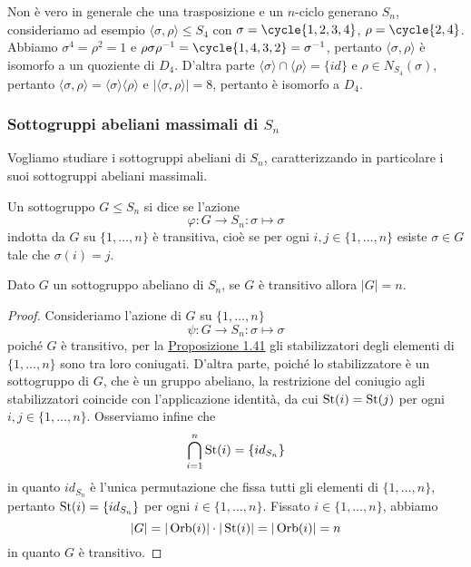 \documentclass[11pt]{scrartcl}
\begin{document}
\begin{remark}
    Non è vero in generale che una trasposizione e un $n$-ciclo generano $S_n$,
    consideriamo ad esempio $\langle\sigma, \rho\rangle\leqslant S_4$ con
    $\sigma = \cycle{1, 2, 3, 4}$, $\rho = \cycle{2, 4}$. Abbiamo
    $\sigma^4 = \rho^2 = 1$ e $\rho\sigma\rho^{-1} = \cycle{1, 4, 3, 2} =
    \sigma^{-1}$, pertanto $\langle\sigma, \rho\rangle$ è isomorfo a un 
    quoziente di $D_4$. D'altra parte $\langle\sigma\rangle\cap \langle\rho\rangle = \{id\}$
    e $\rho \in N_{S_4}(\sigma)$, pertanto $\langle\sigma, \rho\rangle =
    \langle\sigma\rangle\langle\rho\rangle$ e $|\langle\sigma, \rho\rangle| = 8$,
    pertanto è isomorfo a $D_4$. 
\end{remark}

\subsubsection{Sottogruppi abeliani massimali di $S_n$}

Vogliamo studiare i sottogruppi abeliani di $S_n$, caratterizzando in particolare
i suoi sottogruppi abeliani massimali.

\begin{definition}
    Un sottogruppo $G\leqslant S_n$ si dice  se l'azione
    \[
        \varphi: G\longrightarrow S_n :\sigma \longmapsto \sigma
    \]indotta da $G$ su $\{1, \ldots, n\}$ è transitiva, cioè se per ogni
    $i, j \in \{1, \ldots, n\}$ esiste $\sigma \in G$ tale che $\sigma(i) = j$.
\end{definition}

\begin{lemma}
    \label{lemma1.54}
    Dato $G$ un sottogruppo abeliano di $S_n$, se $G$ è transitivo allora $|G| = n$.
\end{lemma}

\begin{proof}
    Consideriamo l'azione di $G$ su $\{1, \ldots, n\}$
    \[
        \psi : G\longrightarrow S_n :\sigma \longmapsto \sigma
    \]
    poiché $G$ è transitivo, per la \hyperref[prop1.41]{Proposizione 1.41}
    gli stabilizzatori degli elementi di $\{1, \ldots, n\}$ sono tra loro coniugati.
    D'altra parte, poiché lo stabilizzatore è un sottogruppo di $G$, che
    è un gruppo abeliano, la restrizione del coniugio agli
    stabilizzatori coincide con l'applicazione identità, da cui $\operatorname{St}(i) = \operatorname{St}(j)$
    per ogni $i, j \in \{1, \ldots, n\}$. Osserviamo infine che 
    \[
        \bigcap_{i = 1}^n \operatorname{St}(i) = \{id_{S_n}\}
    \]in quanto $id_{S_n}$ è l'unica permutazione che fissa tutti gli elementi
    di $\{1, \ldots, n\}$, pertanto $\operatorname{St}(i) = \{id_{S_n}\}$ per ogni $i \in \{1, \ldots, n\}$.
    Fissato $i \in \{1, \ldots, n\}$, abbiamo 
    \[
        |G| = |\operatorname{Orb}(i)|\cdot|\operatorname{St}(i)| = |\operatorname{Orb}(i)| = n
    \]
    in quanto $G$ è transitivo.
\end{proof}
\end{document}

